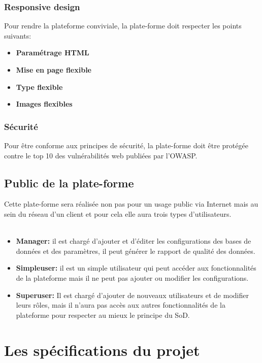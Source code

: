 \documentclass[oneside]{book}
\begin{document}
\subsection{Responsive design}
Pour rendre la plateforme conviviale, la plate-forme doit respecter les points suivants:
\begin{itemize}
    \item \textbf{Paramétrage HTML}
    \item \textbf{Mise en page flexible}
    \item \textbf{Type flexible}
    \item \textbf{Images flexibles}
\end{itemize}
\subsection{Sécurité}
Pour être conforme aux principes de sécurité, la plate-forme doit être protégée contre le top 10 des vulnérabilités web publiées par l'OWASP.

\section{Public de la plate-forme}
Cette plate-forme sera réalisée non pas pour un usage public via Internet mais au sein du réseau d'un client et pour cela elle aura trois types d'utilisateurs.\\
\\
    \begin{itemize}
        \item \textbf{Manager:} il est chargé d'ajouter et d'éditer les configurations des bases de données et des paramètres, il peut générer le rapport de qualité des données.
        \\
        \item \textbf{Simpleuser:} il est un simple utilisateur qui peut accéder aux fonctionnalités de la plateforme mais il ne peut pas ajouter ou modifier les configurations.
        \\
        \item \textbf{Superuser:} Il est chargé d'ajouter de nouveaux utilisateurs et de modifier leurs rôles, mais il n'aura pas accès aux autres fonctionnalités de la plateforme pour respecter au mieux le principe du SoD.
    \end{itemize}
\chapter{Les spécifications du projet}
\end{document}
